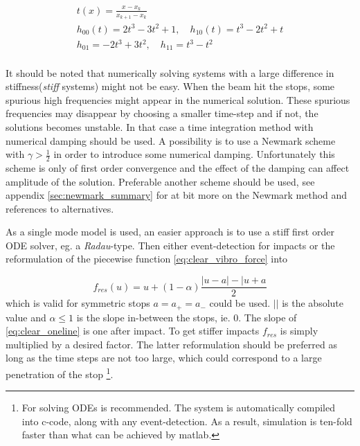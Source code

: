 \begin{equation}
  \label{eq:fnl_piecewise_coeff}
  \begin{gathered}
    t(x) = \frac{x - x_k}{x_{k+1} - x_k}\\
    h_{00}(t) =  2t^3 - 3t^2 + 1, \quad
    h_{10}(t) = t^3 - 2t^2 + t \\
    h_{01} = -2t^3 + 3t^2, \quad
    h_{11} = t^3 - t^2 \\
  \end{gathered}
\end{equation}

It should be noted that numerically solving systems with a large difference in
stiffness(\textit{stiff} systems) might not be easy. When the
beam hit the stops, some spurious high frequencies might appear in the numerical
solution. These spurious frequencies may disappear by choosing a smaller
time-step and if not, the solutions becomes unstable. In that case a time
integration method with numerical damping should be used. A possibility is to
use a Newmark scheme with $\gamma > \frac{1}{2}$ in order to introduce some
numerical damping. Unfortunately this scheme is only of first order convergence
and the effect of the damping can affect amplitude of the solution. Preferable
another scheme should be used, see appendix \ref{sec:newmark_summary} for at bit
more on the Newmark method and references to alternatives.

As a single mode model is used, an easier approach is to use a stiff first order ODE
solver, eg. a \textit{Radau}-type. Then either event-detection for impacts or the
reformulation of the piecewise function \eqref{eq:clear_vibro_force} into

\begin{equation}
  \label{eq:clear_oneline}
  f_{res}(u) = u + (1-\alpha)\frac{|u-a|-|u+a}{2}
\end{equation}
which is valid for symmetric stops $a = a_+=a_-$ could be used. $||$ is the
absolute value and $\alpha \leq 1$ is the slope in-between the stops, ie. 0. The
slope of \eqref{eq:clear_oneline} is one after impact. To get stiffer impacts
$f_{res}$ is simply multiplied by a desired factor. The latter reformulation
should be preferred as long as the time steps are not too large, which could
correspond to a large penetration of the stop \footnote{For solving ODEs
  \autocite{pydstool} is recommended. The system is automatically compiled into
  c-code, along with any event-detection. As a result, simulation is ten-fold
  faster than what can be achieved by matlab.}.




